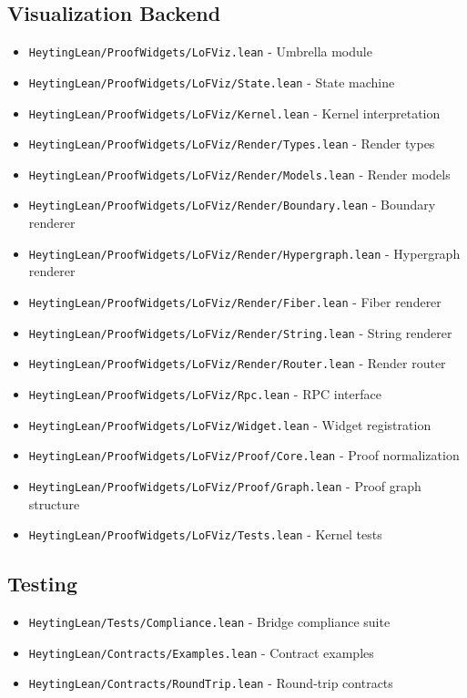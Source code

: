 \documentclass{amsart}
\theoremstyle{definition}
\theoremstyle{remark}
\begin{document}
\subsection{Visualization Backend}
\begin{itemize}
\item \texttt{HeytingLean/ProofWidgets/LoFViz.lean} - Umbrella module
\item \texttt{HeytingLean/ProofWidgets/LoFViz/State.lean} - State machine
\item \texttt{HeytingLean/ProofWidgets/LoFViz/Kernel.lean} - Kernel interpretation
\item \texttt{HeytingLean/ProofWidgets/LoFViz/Render/Types.lean} - Render types
\item \texttt{HeytingLean/ProofWidgets/LoFViz/Render/Models.lean} - Render models
\item \texttt{HeytingLean/ProofWidgets/LoFViz/Render/Boundary.lean} - Boundary renderer
\item \texttt{HeytingLean/ProofWidgets/LoFViz/Render/Hypergraph.lean} - Hypergraph renderer
\item \texttt{HeytingLean/ProofWidgets/LoFViz/Render/Fiber.lean} - Fiber renderer
\item \texttt{HeytingLean/ProofWidgets/LoFViz/Render/String.lean} - String renderer
\item \texttt{HeytingLean/ProofWidgets/LoFViz/Render/Router.lean} - Render router
\item \texttt{HeytingLean/ProofWidgets/LoFViz/Rpc.lean} - RPC interface
\item \texttt{HeytingLean/ProofWidgets/LoFViz/Widget.lean} - Widget registration
\item \texttt{HeytingLean/ProofWidgets/LoFViz/Proof/Core.lean} - Proof normalization
\item \texttt{HeytingLean/ProofWidgets/LoFViz/Proof/Graph.lean} - Proof graph structure
\item \texttt{HeytingLean/ProofWidgets/LoFViz/Tests.lean} - Kernel tests
\end{itemize}

\subsection{Testing}
\begin{itemize}
\item \texttt{HeytingLean/Tests/Compliance.lean} - Bridge compliance suite
\item \texttt{HeytingLean/Contracts/Examples.lean} - Contract examples
\item \texttt{HeytingLean/Contracts/RoundTrip.lean} - Round-trip contracts
\end{itemize}
\end{document}
